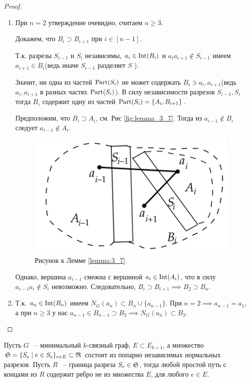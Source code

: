 \begin{proof}

	\begin{enumerate}
		\item  При $n = 2$ утверждение очевидно, считаем $n \geq 3$.

			Докажем, что  $B_i \supset B_{i + 1}$ при $i \in [n - 1]$.

			Т.к. разрезы  $S_{i - 1}$ и $S_i$ независимы, $a_i \in \Int(B_i)$ и $a_i a_{i + 1} \not \in S_{i - 1}$ имеем $a_{i + 1} \in B_i$(ведь иначе $S_{i - 1}$ разделяет $S$ ).


Значит, ни одна из частей $\Part(S_i)$ не может содержать $B_i \ni a_i, a_{i + 1}$(ведь $a_i, a_{i + 1}$ в разных частях  $\Part(S_i)$). В силу независимости разрезов  $S_{i - 1}, S_i$ тогда  $B_i$ содержит одну из частей $\Part(S_i) = \{A_i, B_{i + 1}\}$. 

Предположим, что $B_i \supset A_i$, см. Рис \eqref{fig:lemma_3_7}. Тогда из $a_{i - 1} \not \in B_i$ следует $a_{i - 1} \not \in A_i$.

\begin{figure}[ht]
    \centering
	\includegraphics[width=0.4\columnwidth]{figures/lemma_3_7.png}
	\caption{Рисунок к Лемме \ref{lemma:3_7}.}
    \label{fig:lemma_3_7}
\end{figure}

Однако, вершина $a_{i - 1}$ смежна с вершиной $a_i \in \Int(A_i)$, что в силу $a_{i-1}a_i \not \in S_i$ невозможно. Следовательно, $B_i \supset B_{i + 1} \implies B_2 \supset B_n$.

\item Т.к. $a_n \in \Int(B_n)$ имеем  $N_G(a_n) \subset B_n \cup \{a_{n - 1}\}$.
	При $n = 2 \implies a_{n-  1} = a_1$, а при  $n \geqslant 3 $ у нас $a_{n - 1} \in B_{n - 1} \supset B_2 \implies N_G(a_n) \subset B_2$. 
	\end{enumerate}

\end{proof}

\begin{customlm}{3.8} \label{lemma:3_8}
	Пусть $G$ ~-- минимальный  $k$-связный граф,  $E \subset E_{k + 1}$, а множество  $\S = \{S_e \mid e \in S_e\}_{e \in E} \subset \R$ состоит из попарно независимых нормальных разрезов.
	Пусть  $R$ ~-- граница разреза  $S_e \in \S$, тогда любой простой путь с концами из  $R$ содержит ребро не из множества  $E$, для любого $e \in E$.
\end{customlm}

